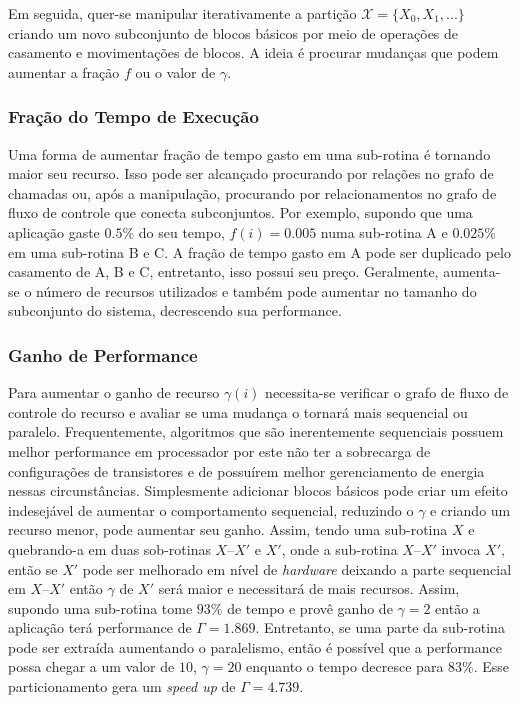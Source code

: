 Em seguida, quer-se manipular iterativamente a partição $ \mathcal{X} = \{ X_0, X_1, ...\} $ criando um novo subconjunto de blocos básicos por meio de operações de casamento e movimentações de blocos. A ideia é procurar mudanças que podem aumentar a fração $ f $ ou o valor de $ \gamma $.



\subsubsection{Fração do Tempo de Execução}

Uma forma de aumentar fração de tempo gasto em uma sub-rotina é tornando maior seu recurso. Isso pode ser alcançado procurando por relações no grafo de chamadas ou, após a manipulação, procurando por relacionamentos no grafo de fluxo de controle que conecta subconjuntos. Por exemplo, supondo que uma aplicação gaste $ 0.5 \% $ do seu tempo, $ f(i) = 0.005 $ numa sub-rotina A e $ 0.025\% $ em uma sub-rotina B e C. A fração de tempo gasto em A pode ser duplicado pelo casamento de A, B e C, entretanto, isso possui seu preço. Geralmente, aumenta-se o número de recursos utilizados e também pode aumentar no tamanho do subconjunto do sistema, decrescendo sua performance.



\subsubsection{Ganho de Performance}

Para aumentar o ganho de recurso $ \gamma (i) $ necessita-se verificar o grafo de fluxo de controle do recurso e avaliar se uma mudança o tornará mais sequencial ou paralelo. Frequentemente, algoritmos que são inerentemente sequenciais possuem melhor performance em processador por este não ter a sobrecarga de configurações de transistores e de possuírem melhor gerenciamento de energia nessas circunstâncias. Simplesmente adicionar blocos básicos pode criar um efeito indesejável de aumentar o comportamento sequencial, reduzindo o $ \gamma $ e criando um recurso menor, pode aumentar seu ganho. Assim, tendo uma sub-rotina $ X $ e quebrando-a em duas sob-rotinas $ X – X' $ e $ X' $, onde a sub-rotina $ X – X' $ invoca $ X' $, então se $ X' $ pode ser melhorado em nível de \textit{hardware} deixando a parte sequencial em $ X – X' $ então $ \gamma $ de $ X' $ será maior e necessitará de mais recursos. Assim, supondo uma sub-rotina tome $ 93\% $ de tempo e provê ganho de $ \gamma = 2 $ então a aplicação terá performance de $ \Gamma = 1.869 $. Entretanto, se uma parte da sub-rotina pode ser extraída aumentando o paralelismo, então é possível que a performance possa chegar a um valor de $ 10 $, $ \gamma = 20 $ enquanto o tempo decresce para $ 83\% $. Esse particionamento gera um \textit{\textit{speed up}} de $ \Gamma = 4.739 $.


